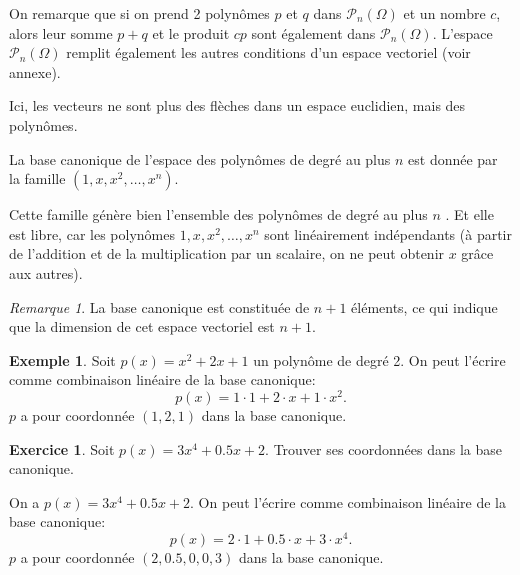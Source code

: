 \documentclass[11pt,a4paper]{article}
\numberwithin{equation}{section}
\theoremstyle{plain}
\theoremstyle{definition}
\newtheorem{example}[theorem]{Exemple}
\newtheorem{exercise}[theorem]{Exercice}
\theoremstyle{remark}
\newtheorem*{remark}{Remarque}
\begin{document}
On remarque que si on prend 2 polynômes \(p\) et \(q\) dans \(\mathcal{P}_n(\Omega)\) et un nombre \(c\), alors leur somme \(p + q\) et le produit \(c p\) sont également dans \(\mathcal{P}_n(\Omega)\).
L'espace \(\mathcal{P}_n(\Omega)\) remplit également les autres conditions d'un espace vectoriel (voir annexe).

Ici, les vecteurs ne sont plus des flèches dans un espace euclidien, mais des polynômes.

La base canonique de l'espace des polynômes de degré au plus \(n\) est donnée par la famille \((1, x, x^2, \ldots, x^n)\).

Cette famille génère bien l'ensemble des polynômes de degré au plus \(n\) . Et elle est libre, car les polynômes \(1, x, x^2, \ldots, x^n\) sont linéairement indépendants (à partir de l'addition et de la multiplication par un scalaire, on ne peut obtenir $x$ grâce aux autres).

\begin{remark}
    La base canonique est constituée de $n+1$ éléments, ce qui indique que la dimension de cet espace vectoriel est $n+1$.
\end{remark}

\begin{example}
    Soit $p(x) = x^2 + 2x + 1$ un polynôme de degré 2. On peut l'écrire comme combinaison linéaire de la base canonique:
    \[
        p(x) = 1 \cdot 1 + 2 \cdot x + 1 \cdot x^2.
    \]
    $p$ a pour coordonnée $(1, 2, 1)$ dans la base canonique.
\end{example}

\begin{exercise}
    Soit $p(x) = 3x^4 + 0.5 x +2$. Trouver ses coordonnées dans la base canonique.
\end{exercise}

\begin{solution}
On a $p(x) = 3x^4 + 0.5 x +2$. On peut l'écrire comme combinaison linéaire de la base canonique:
\[
    p(x) = 2 \cdot 1 + 0.5 \cdot x + 3 \cdot x^4.
\]
$p$ a pour coordonnée $(2, 0.5, 0, 0, 3)$ dans la base canonique.
\end{solution}
\end{document}
